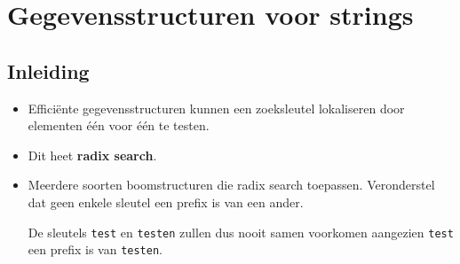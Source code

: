 \chapter{Gegevensstructuren voor strings}
\section{Inleiding}
\begin{itemize}
    \item Efficiënte gegevensstructuren kunnen een zoeksleutel lokaliseren door elementen één voor één te testen.
    \item Dit heet \textbf{radix search}.
    \item Meerdere soorten boomstructuren die radix search toepassen.
    \alert Veronderstel dat geen enkele sleutel een prefix is van een ander.

    De sleutels \texttt{test} en \texttt{testen} zullen dus nooit samen voorkomen aangezien \texttt{test} een prefix is van \texttt{testen}.
\end{itemize}

